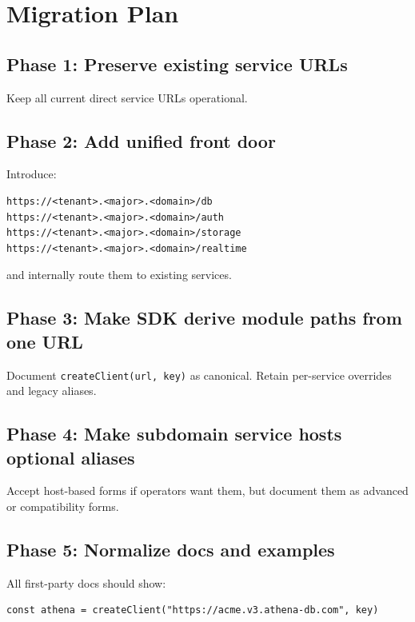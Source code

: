 \documentclass[11pt]{article}
\begin{document}
\section{Migration Plan}

\subsection*{Phase 1: Preserve existing service URLs}

Keep all current direct service URLs operational.

\subsection*{Phase 2: Add unified front door}

Introduce:

\begin{lstlisting}
https://<tenant>.<major>.<domain>/db
https://<tenant>.<major>.<domain>/auth
https://<tenant>.<major>.<domain>/storage
https://<tenant>.<major>.<domain>/realtime
\end{lstlisting}

and internally route them to existing services.

\subsection*{Phase 3: Make SDK derive module paths from one URL}

Document \texttt{createClient(url, key)} as canonical. Retain per-service overrides and legacy aliases.

\subsection*{Phase 4: Make subdomain service hosts optional aliases}

Accept host-based forms if operators want them, but document them as advanced or compatibility forms.

\subsection*{Phase 5: Normalize docs and examples}

All first-party docs should show:

\begin{lstlisting}[language=TypeScriptAthena]
const athena = createClient("https://acme.v3.athena-db.com", key)
\end{lstlisting}
\end{document}
